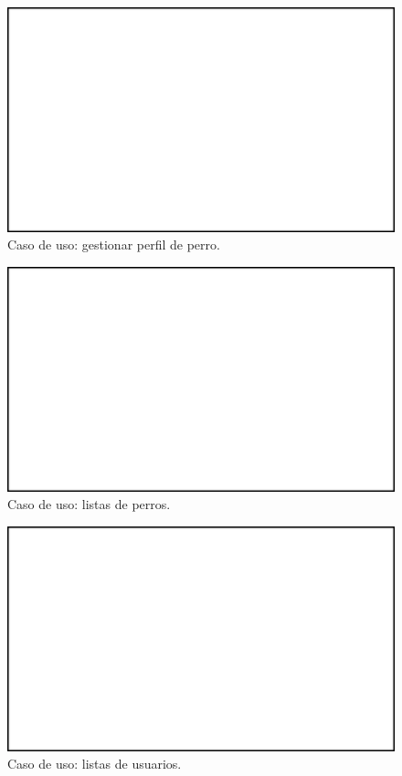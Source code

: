 \documentclass[a4paper, 12pt]{article}
\begin{document}
\begin{figure}[H]
	\begin{center}
		{\includegraphics[width=12cm]{White.png}\par}
		\caption{Caso de uso: gestionar perfil de perro.}
	\end{center}
\end{figure}


\begin{figure}[H]
	\begin{center}
		{\includegraphics[width=12cm]{White.png}\par}
		\caption{Caso de uso: listas de perros.}
	\end{center}
\end{figure}


\begin{figure}[H]
	\begin{center}
		{\includegraphics[width=12cm]{White.png}\par}
		\caption{Caso de uso: listas de usuarios.}
	\end{center}
\end{figure}
\end{document}
